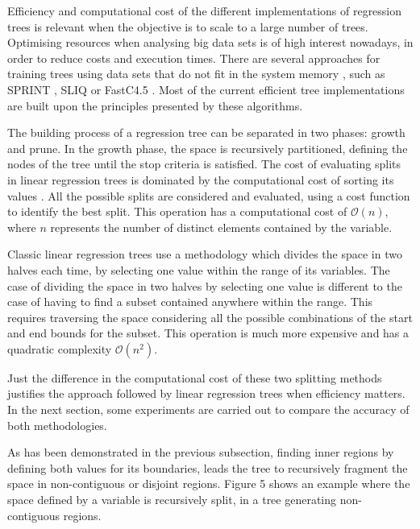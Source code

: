 \documentclass[times,twocolumn,final,authoryear]{elsarticle}
\begin{document}
Efficiency and computational cost of the different implementations of regression trees is relevant when the objective is to scale to a large number of trees. Optimising resources when analysing big data sets is of high interest nowadays, in order to reduce costs and execution times. There are several approaches for training trees using data sets that do not fit in the system memory \citep{Rokach2016}, such as SPRINT \citep{Shareretal1996}, SLIQ \citep{Mehtaetal1996} or FastC4.5 \citep{Heetal2007}. Most of the current efficient tree implementations are built upon the principles presented by these algorithms.

The building process of a regression tree can be separated in two phases: growth and prune. In the growth phase, the space is recursively partitioned, defining the nodes of the tree until the stop criteria is satisfied. The cost of evaluating splits in linear regression trees is dominated by the computational cost of sorting its values \citep{Shareretal1996}. All the possible splits are considered and evaluated, using a cost function to identify the best split. This operation has a computational cost of $\mathcal{O}(n)$, where $n$ represents the number of distinct elements contained by the variable.

Classic linear regression trees use a methodology which divides the space in two halves each time, by selecting one value within the range of its variables. The case of dividing the space in two halves by selecting one value is different to the case of having to find a subset contained anywhere within the range. This requires traversing the space considering all the possible combinations of the start and end bounds for the subset. This operation is much more expensive and has a quadratic complexity $\mathcal{O}(n^2)$.

Just the difference in the computational cost of these two splitting methods justifies the approach followed by linear regression trees when efficiency matters. In the next section, some experiments are carried out to compare the accuracy of both methodologies.

As has been demonstrated in the previous subsection, finding inner regions by defining both values for its boundaries, leads the tree to recursively fragment the space in non-contiguous or disjoint regions. Figure 5 shows an example where the space defined by a variable is recursively split, in a tree generating non-contiguous regions.

%
%
\end{document}
